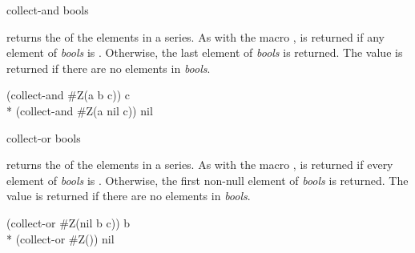 \begin{defun}[Function]
collect-and bools

 returns the  of the elements in a series.  As
with the macro ,  is returned if any element of {\it
bools} is .  Otherwise, the last element of {\it bools} is
returned.  The value  is returned if there are no elements in {\it
bools}.
\begin{lisp}
(collect-and \#Z(a b c)) {\EV} c \\*
(collect-and \#Z(a nil c)) {\EV} nil
\end{lisp}
\end{defun}

\begin{defun}[Function]
collect-or bools

 returns the  of the elements in a series.  As with
the macro ,  is returned if every element of {\it
bools} is .  Otherwise, the first non-null element of {\it bools}
is returned.  The value  is returned if there are no elements in
{\it bools}.
\begin{lisp}
(collect-or \#Z(nil b c)) {\EV} b \\*
(collect-or \#Z()) {\EV} nil
\end{lisp}
\end{defun}

